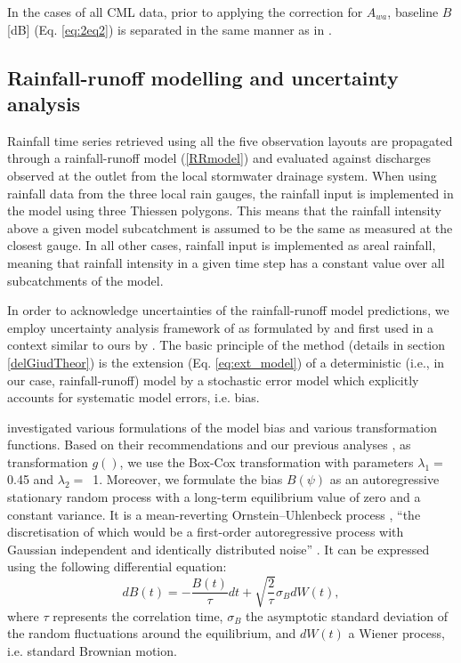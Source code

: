 \documentclass{ctuthesis}\usepackage[]{graphicx}\usepackage[]{color}
\begin{document}
In the cases of all CML data, prior to applying the correction for $A_{wa}$, baseline $B$ [dB] (Eq. \ref{eq:2eq2}) is separated in the same manner as in \cite{fenclGaugeadjustedRainfallEstimates2017}.



\subsection{Rainfall-runoff modelling and uncertainty analysis}

Rainfall time series retrieved using all the five observation layouts are propagated through a rainfall-runoff model (\ref{RRmodel}) and evaluated against discharges observed at the outlet from the local stormwater drainage system. When using rainfall data from the three local rain gauges, the rainfall input is implemented in the model using three Thiessen polygons. This means that the rainfall intensity above a given model subcatchment is assumed to be the same as measured at the closest gauge. In all other cases, rainfall input is implemented as areal rainfall, meaning that rainfall intensity in a given time step has a constant value over all subcatchments of the model. 

In order to acknowledge uncertainties of the rainfall-runoff model predictions, we employ uncertainty analysis framework of \cite{kennedy2001bayesian} as formulated by \cite{reichert2012linking} and first used in a context similar to ours by \cite{giudice2013improving}. The basic principle of the method (details in section \ref{delGiudTheor}) is the extension (Eq. \ref{eq:ext_model}) of a deterministic (i.e., in our case, rainfall-runoff) model by a stochastic error model which explicitly accounts for systematic model errors, i.e. bias. 

\cite{giudice2013improving} investigated various formulations of the model bias and various transformation functions. Based on their recommendations and our previous analyses \citep{pastorekEffectDifferentRainfall2016}, as transformation $g()$, we use the Box-Cox transformation \citep{box1964analysis} with parameters $\lambda_1 =$ 0.45 and $\lambda_2 =$~1. Moreover,   we formulate the bias $B (\psi)$ as an autoregressive stationary random process with a long-term equilibrium value of zero and a constant variance. It is a mean-reverting Ornstein–Uhlenbeck process \citep{uhlenbeck1930theory}, \enquote{the discretisation of which would be a first-order autoregressive process with Gaussian independent and identically distributed noise} \citep{giudice2013improving}. It can be expressed using the following differential equation:
\begin{equation} 
dB (t)= - \frac{B (t)}{\tau}dt + \sqrt{\frac{2}{\tau}} \sigma_{B}  dW(t),
\end{equation}
where $\tau$ represents the correlation time, $\sigma_{B}$ the asymptotic standard deviation of the random fluctuations around the equilibrium, and $dW(t)$ a Wiener process, i.e. standard Brownian motion.
\end{document}
